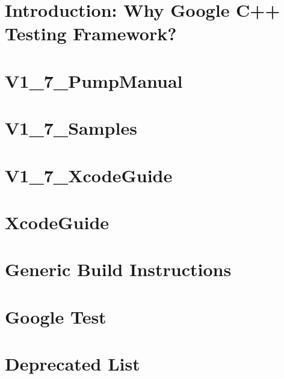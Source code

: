 \documentclass[twoside]{book}
\newcommand{\+}{\discretionary{\mbox{\scriptsize$\hookleftarrow$}}{}{}}
\begin{document}
\chapter{Introduction\+: Why Google C++ Testing Framework?}
\label{md_vendor_googletest_googletest_docs_V1_7_Primer}

\chapter{V1\+\_\+7\+\_\+\+Pump\+Manual}
\label{md_vendor_googletest_googletest_docs_V1_7_PumpManual}

\chapter{V1\+\_\+7\+\_\+\+Samples}
\label{md_vendor_googletest_googletest_docs_V1_7_Samples}

\chapter{V1\+\_\+7\+\_\+\+Xcode\+Guide}
\label{md_vendor_googletest_googletest_docs_V1_7_XcodeGuide}

\chapter{Xcode\+Guide}
\label{md_vendor_googletest_googletest_docs_XcodeGuide}

\chapter{Generic Build Instructions}
\label{md_vendor_googletest_googletest_README}

\chapter{Google Test}
\label{md_vendor_googletest_README}

\chapter{Deprecated List}
\label{deprecated}

\end{document}
